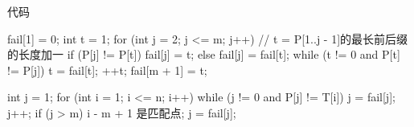 \documentclass{ctexbeamer}
\begin{document}
\begin{frame}[fragile]{代码}
\begin{cverb}
fail[1] = 0;
int t = 1;
for (int j = 2; j <= m; j++) {
// t = P[1..j - 1]的最长前后缀的长度加一
  if (P[j] != P[t])
    fail[j] = t;
  else
    fail[j] = fail[t];
  while (t != 0 and P[t] != P[j])
    t = fail[t];
  ++t;
}
fail[m + 1] = t;

int j = 1;
for (int i = 1; i <= n; i++) {
  while (j != 0 and P[j] != T[i])
    j = fail[j];
  j++;
  if (j > m) {
    i - m + 1 是匹配点;
    j = fail[j];
  }
}
\end{cverb}
\end{frame}
\end{document}
